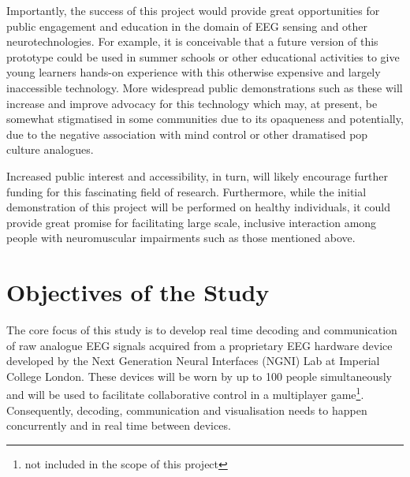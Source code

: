 Importantly, the success of this project would provide great opportunities for public engagement and education in the domain of EEG sensing and other neurotechnologies. For example, it is conceivable that a future version of this prototype could be used in summer schools or other educational activities to give young learners hands-on experience with this otherwise expensive and largely inaccessible technology. More widespread public demonstrations such as these will increase and improve advocacy for this technology which may, at present, be somewhat stigmatised in some communities due to its opaqueness and potentially, due to the negative association with mind control or other dramatised pop culture analogues.

Increased public interest and accessibility, in turn, will likely encourage further funding for this fascinating field of research. Furthermore, while the initial demonstration of this project will be performed on healthy individuals, it could provide great promise for facilitating large scale, inclusive interaction among people with neuromuscular impairments such as those mentioned above.  

\section{Objectives of the Study}
The core focus of this study is to develop real time decoding and communication of raw analogue EEG signals acquired from a proprietary EEG hardware device developed by the Next Generation Neural Interfaces (NGNI) Lab at Imperial College London. These devices will be worn by up to 100 people simultaneously and will be used to facilitate collaborative control in a multiplayer game\footnote{not included in the scope of this project}. Consequently, decoding, communication and visualisation needs to happen concurrently and in real time between devices. 

